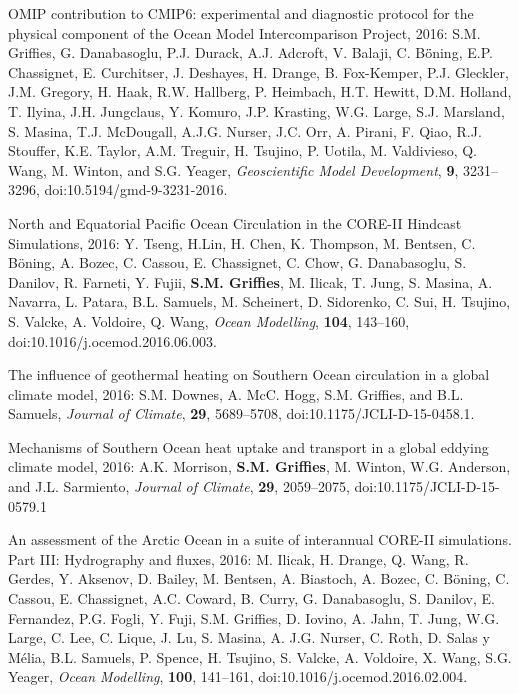 \begin{etaremune}

\item OMIP contribution to CMIP6: experimental and diagnostic protocol for the physical component of the Ocean Model Intercomparison  Project, 2016: S.M. Grif\/f\/ies, G. Danabasoglu, P.J. Durack,
  A.J. Adcroft, V. Balaji, C. B\"{o}̈ning, E.P. Chassignet,
  E. Curchitser, J. Deshayes, H. Drange, B. Fox-Kemper, P.J. Gleckler,
  J.M. Gregory, H. Haak, R.W. Hallberg, P. Heimbach, H.T. Hewitt,
  D.M. Holland, T. Ilyina, J.H. Jungclaus, Y. Komuro, J.P. Krasting,
  W.G. Large, S.J. Marsland, S. Masina, T.J. McDougall, A.J.G. Nurser,
  J.C. Orr, A. Pirani, F. Qiao, R.J. Stouffer, K.E. Taylor,
  A.M. Treguir, H. Tsujino, P. Uotila, M. Valdivieso, Q. Wang,
  M. Winton, and S.G. Yeager, {\it Geoscientific Model Development},
  {\bf 9}, 3231--3296, doi:10.5194/gmd-9-3231-2016.

\item North and Equatorial Pacific Ocean Circulation in the CORE-II
  Hindcast Simulations, 2016: Y. Tseng, H.Lin, H. Chen, K.  Thompson,
  M. Bentsen, C. B\"{o}ning, A. Bozec, C. Cassou, E.  Chassignet,
  C. Chow, G. Danabasoglu, S. Danilov, R. Farneti, Y. Fujii, {\bf
    S.M. Grif\/f\/ies}, M. Ilicak, T. Jung, S. Masina, A. Navarra,
  L. Patara, B.L.  Samuels, M. Scheinert, D. Sidorenko, C. Sui,
  H. Tsujino, S. Valcke, A. Voldoire, Q. Wang, {\it Ocean Modelling},
  {\bf 104}, 143--160, doi:10.1016/j.ocemod.2016.06.003.

\item The influence of geothermal heating on Southern Ocean
  circulation in a global climate model, 2016: S.M. Downes,
  A. McC. Hogg, S.M. Grif\/f\/ies, and B.L. Samuels, {\it
    Journal of Climate}, {\bf 29}, 5689--5708,
  doi:10.1175/JCLI-D-15-0458.1.

\item Mechanisms of Southern Ocean heat uptake and transport in a
  global eddying climate model, 2016: A.K. Morrison, {\bf
    S.M. Grif\/f\/ies}, M. Winton, W.G. Anderson, and J.L. Sarmiento,
  {\it Journal of Climate}, {\bf 29}, 2059--2075,
  doi:10.1175/JCLI-D-15-0579.1

\item An assessment of the Arctic Ocean in a suite of interannual
  CORE-II simulations. Part III: Hydrography and fluxes, 2016:
  M. Ilicak, H. Drange, Q. Wang, R. Gerdes, Y. Aksenov, D. Bailey,
  M. Bentsen, A. Biastoch, A. Bozec, C. B\"{o}ning, C. Cassou,
  E. Chassignet, A.C. Coward, B. Curry, G. Danabasoglu, S. Danilov,
  E. Fernandez, P.G. Fogli, Y. Fuji, S.M. Grif\/f\/ies,
  D. Iovino, A. Jahn, T. Jung, W.G. Large, C. Lee, C. Lique, J. Lu,
  S. Masina, A. J.G. Nurser, C. Roth, D. Salas y M\'{e}lia,
  B.L. Samuels, P. Spence, H. Tsujino, S. Valcke, A. Voldoire,
  X. Wang, S.G. Yeager, {\it Ocean Modelling}, {\bf 100}, 141--161,
  doi:10.1016/j.ocemod.2016.02.004.


\end{etaremune}
